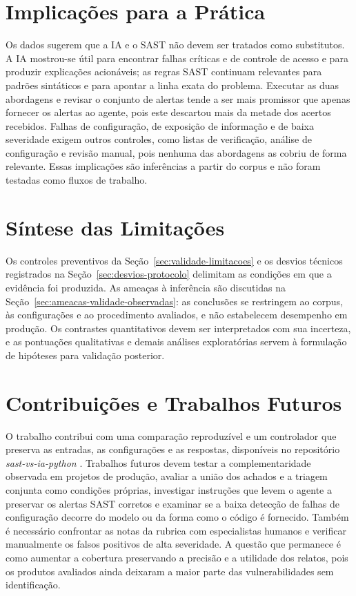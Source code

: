 \section{Implicações para a Prática}\label{sec:implicacoes}

Os dados sugerem que a IA e o SAST não devem ser tratados como substitutos.
A IA mostrou-se útil para encontrar falhas críticas e de controle de acesso e
para produzir explicações acionáveis; as regras SAST continuam relevantes
para padrões sintáticos e para apontar a linha exata do problema. Executar as
duas abordagens e revisar o conjunto de alertas tende a ser mais promissor
que apenas fornecer os alertas ao agente, pois este descartou mais da metade
dos acertos recebidos. Falhas de configuração, de exposição de informação e
de baixa severidade exigem outros controles, como listas de verificação,
análise de configuração e revisão manual, pois nenhuma das abordagens as
cobriu de forma relevante. Essas implicações são inferências a partir do
corpus e não foram testadas como fluxos de trabalho.

\section{Síntese das Limitações}\label{sec:limitacoes-conclusao}

Os controles preventivos da Seção~\ref{sec:validade-limitacoes} e os desvios
técnicos registrados na Seção~\ref{sec:desvios-protocolo} delimitam as condições
em que a evidência foi produzida. As ameaças à inferência são discutidas na
Seção~\ref{sec:ameacas-validade-observadas}: as conclusões se restringem ao
corpus, às configurações e ao procedimento avaliados, e não estabelecem
desempenho em produção. Os contrastes quantitativos devem ser interpretados
com sua incerteza, e as pontuações qualitativas e demais análises exploratórias
servem à formulação de hipóteses para validação posterior.

\section{Contribuições e Trabalhos Futuros}\label{sec:trabalhos-futuros}

O trabalho contribui com uma comparação reproduzível e um controlador que preserva
as entradas, as configurações e as respostas, disponíveis no repositório
\textit{sast-vs-ia-python} \cite{Motta2026Repositorio}. Trabalhos futuros devem
testar a complementaridade observada em projetos de produção, avaliar a união
dos achados e a triagem conjunta como condições próprias, investigar instruções
que levem o agente a preservar os alertas SAST corretos e examinar se a baixa
detecção de falhas de configuração decorre do modelo ou da forma como o código
é fornecido. Também é necessário confrontar as notas da rubrica com especialistas
humanos e verificar manualmente os falsos positivos de alta severidade. A questão
que permanece é como aumentar a cobertura preservando a precisão e a utilidade
dos relatos, pois os produtos avaliados ainda deixaram a maior parte das
vulnerabilidades sem identificação.
